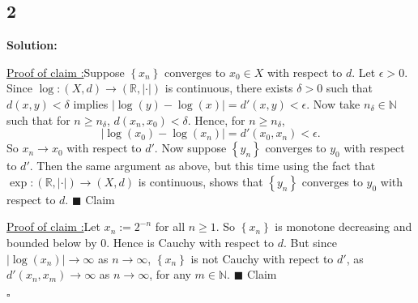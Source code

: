\documentclass[12pt]{article}
\newcounter{ProofCounter}
\newcounter{ClaimCounter}[ProofCounter]
\newenvironment{Solution}{\stepcounter{ProofCounter}\textbf{Solution:}}{\hfill$\square$}
\newenvironment{claim}[1]{\vspace{1mm}\stepcounter{ClaimCounter}\par\noindent\underline{\bf Claim \theClaimCounter:}\space#1}{}
\newenvironment{claimproof}[1]{\par\noindent\underline{Proof of claim \theClaimCounter:}\space#1}{\hfill $\blacksquare$ Claim \theClaimCounter}
\begin{document}
\subsection*{2}
\begin{Solution}
  \begin{claimproof}
    Suppose $\left\{ x_n \right\}$ converges to $x_0 \in X$ with respect to $d$. Let $\epsilon > 0$. Since $\log : (X,d) \rightarrow (\mathbb{R},
    |\cdot|)$ is continuous, there
    exists $\delta > 0$ such that $d(x,y) < \delta$ implies $|\log(y) - \log(x)| = d'(x,y) < \epsilon$.
    Now take $n_{\delta} \in \mathbb{N}$ such that for $n \geq n_{\delta}$, $d(x_n,x_0) < \delta$. Hence, for $n \geq n_{\delta}$,
    \[
      \big| \log(x_0) - \log(x_n)\big| = d'(x_0, x_n) < \epsilon.
    \]
    So $x_n \rightarrow x_0$ with respect to $d'$. Now suppose $\left\{ y_n \right\}$ converges to $y_0$ with respect to $d'$. Then the
    same argument as above, but this time using the fact that $\exp : (\mathbb{R}, |\cdot|) \rightarrow (X,d)$ is continuous, shows that $\left\{
    y_n \right\}$ converges to $y_0$ with respect to $d$.
  \end{claimproof}

  \begin{claimproof}
    Let $x_n := 2^{-n}$ for all $n\geq 1$. So $\left\{ x_n \right\}$ is monotone decreasing and bounded below by $0$. Hence is Cauchy with respect
    to $d$. But since $|\log(x_n)| \rightarrow \infty$ as $n \rightarrow \infty$,
    $\left\{ x_n \right\}$ is not Cauchy with repect to $d'$, as $d'(x_n, x_m) \rightarrow \infty$ as $n \rightarrow \infty$, for any $m \in
    \mathbb{N}$.
  \end{claimproof}

\end{Solution}
\end{document}
